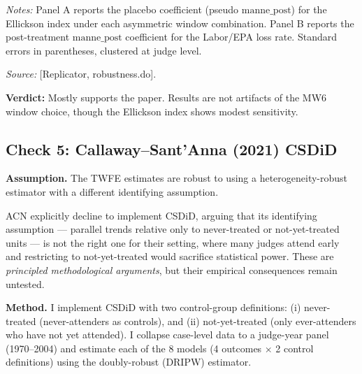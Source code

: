 \documentclass[12pt,a4paper]{article}
\begin{document}
\begin{table}[H]
\centering
\small
\caption{Asymmetric Event Window Sensitivity}
\label{tab:window_asymmetric}
\begin{threeparttable}

\begin{tablenotes}
\item {\small \textit{Notes:} Panel A reports the placebo coefficient (pseudo $\text{manne\_post}$) for the Ellickson index under each asymmetric window combination. Panel B reports the post-treatment $\text{manne\_post}$ coefficient for the Labor/EPA loss rate. Standard errors in parentheses, clustered at judge level.}
\item {\small \textit{Source:} [Replicator, robustness.do].}
\end{tablenotes}
\end{threeparttable}
\end{table}

\textbf{Verdict:} Mostly supports the paper. Results are not artifacts of the MW6 window choice, though the Ellickson index shows modest sensitivity.

\subsection{Check 5: Callaway--Sant'Anna (2021) CSDiD}
\label{sec:check5}

\textbf{Assumption.} The TWFE estimates are robust to using a heterogeneity-robust estimator with a different identifying assumption.

ACN explicitly decline to implement CSDiD, arguing that its identifying assumption --- parallel trends relative only to never-treated or not-yet-treated units --- is not the right one for their setting, where many judges attend early and restricting to not-yet-treated would sacrifice statistical power. These are \emph{principled methodological arguments}, but their empirical consequences remain untested.

\textbf{Method.} I implement CSDiD with two control-group definitions: (i) never-treated (never-attenders as controls), and (ii) not-yet-treated (only ever-attenders who have not yet attended). I collapse case-level data to a judge-year panel (1970--2004) and estimate each of the 8 models (4 outcomes $\times$ 2 control definitions) using the doubly-robust (DRIPW) estimator.
\end{document}
